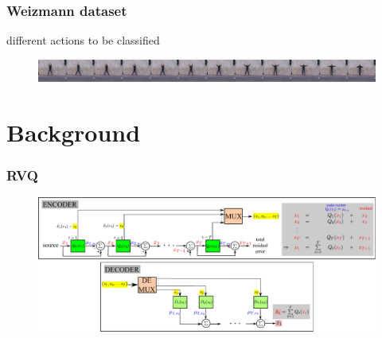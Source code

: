 \begin{frame}
\frametitle{Weizmann dataset}
 different actions to be classified
	\begin{figure}	
		\includegraphics[width=1.0\textwidth]{figs/RVQ_HMM_IPCV2010_Weizmann_dataset.pdf}
	\end{figure}
	\hspace{0.6in}
\end{frame}


\section{Background}
\begin{frame}[plain]
\frametitle{RVQ}
\logoCSIPCPL
	\begin{changemargin}{-1.3in}{0in}
		\begin{figure}				
			\includegraphics[width=1.3\textwidth]{figs/RVQ_blockDiagram.pdf}
			\label{fig:RVQ_SQ_DMSE}
		\end{figure}
	\end{changemargin}
\end{frame}




